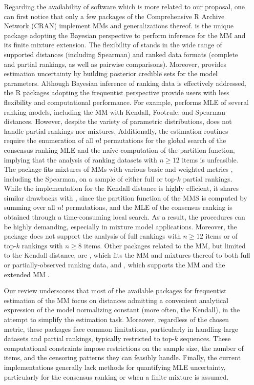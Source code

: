 {Regarding the availability of software which is more related to our proposal, one can first notice that only a few packages of the Comprehensive R Archive Network (CRAN) implement MMs and generalizations thereof.
} 
 \citep{BayesMallows} is the unique package adopting the Bayesian perspective to perform inference for the MM and its finite mixture extension.
The flexibility of  stands in the wide range of supported distances (including Spearman) and ranked data formats (complete and partial rankings, as well as pairwise comparisons). Moreover,  provides estimation uncertainty by building posterior credible sets for the model parameters. Although Bayesian inference of ranking data is effectively addressed, the \textsf{R} packages adopting the frequentist perspective provide users with less flexibility and computational performance. For example,  \citep{pmr_R} performs MLE of several ranking models, including the MM with Kendall, Footrule, and Spearman distances.  
However, despite the variety of parametric distributions,  does not handle partial rankings nor mixtures.
Additionally, the estimation routines require the enumeration of all $n!$ permutations for the global search of the consensus ranking MLE and the naïve computation of the partition function, implying that the analysis of ranking datasets with $n\geq 12$ items is unfeasible.
The  package \citep{rankdist} fits mixtures of MMs with various basic and weighted metrics \citep{lee2012mixtures}, including the Spearman, on a sample of either full or top-$k$ partial rankings. While the implementation for the Kendall distance is highly efficient, it shares similar drawbacks with
, since the partition function of the MMS is computed by summing over all $n!$ permutations, and the MLE of the consensus ranking is obtained through a time-consuming 
local search.  
As a result, the procedures can be highly demanding, especially in mixture model applications. Moreover, the package does not support the analysis of full rankings with $n\geq12$ items or of top-$k$ rankings with $n\geq8$ items. Other packages related to the MM, but limited to the Kendall distance, are  \citep{rmallow}, which fits the MM and mixtures thereof to both full or partially-observed ranking data, and  \citep{extmallows}, which supports the MM and the extended MM \citep{EMMjasa}. 

Our review underscores that most of the available packages for frequentist estimation of the MM focus on distances admitting a convenient analytical expression of the model normalizing constant (more often, the Kendall), in the attempt to simplify the estimation task. 
Moreover, regardless of the chosen metric, these packages face common limitations, particularly in handling large datasets and partial rankings, typically restricted to top-$k$ sequences. These computational constraints impose restrictions on the sample size, the number of items, and the censoring patterns they can feasibly handle. Finally, the current implementations generally lack methods for quantifying MLE uncertainty, particularly for the consensus ranking or when a finite mixture is assumed. 

